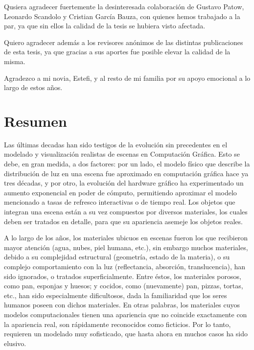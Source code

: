 \documentclass[spanish,a4paper,oneside,10pt,openright]{book}
\begin{document}
Qusiera agradecer fuertemente la desinteresada colaboración de Gustavo Patow, Leonardo Scandolo y Cristian García Bauza, con quienes hemos trabajado a la par, ya que sin ellos la calidad de la tesis se hubiera visto afectada.

Quiero agradecer además a los revisores anónimos de las distintas publicaciones de esta tesis, ya que gracias a sus aportes fue posible elevar la calidad de la misma.

Agradezco a mi novia, Estefi, y al resto de mi familia por su apoyo emocional a lo largo de estos años.

\phantom{p. 1}
\clearpage
\thispagestyle{empty}
\phantom{p. 2}
\clearpage

\chapter*{Resumen} %

Las últimas decadas han sido testigos de la evolución sin precedentes en el modelado y visualización realistas de escenas en Computación Gráfica.
Esto se debe, en gran medida, a dos factores: por un lado, el modelo físico que describe la distribución de luz en una escena fue aproximado en computación gráfica hace ya tres décadas, y por otro, la evolución del hardware gráfico ha experimentado un aumento exponencial en poder de cómputo, permitiendo aproximar el modelo mencionado a tasas de refresco interactivas o de tiempo real.
Los objetos que integran una escena están a su vez compuestos por diversos materiales, los cuales deben ser tratados en detalle, para que su apariencia asemeje los objetos reales.

A lo largo de los años, los materiales ubicuos en escenas fueron los que recibieron mayor atención (agua, nubes, piel humana, etc.), sin embargo muchos materiales, debido a su complejidad estructural (geometría, estado de la materia), o su complejo comportamiento con la luz (reflectancia, absorción, translucencia), han sido ignorados, o tratados superficialmente.
Entre éstos, los materiales porosos, como pan, esponjas y huesos; y cocidos, como (nuevamente) pan, pizzas, tortas, etc., han sido especialmente dificultosos, dada la familiaridad que los seres humanos poseen con dichos materiales.
En otras palabras, los materiales cuyos modelos computacionales tienen una apariencia que no coincide exactamente con la apariencia real, son rápidamente reconocidos como ficticios. Por lo tanto, requieren un modelado muy sofisticado, que hasta ahora en muchos casos ha sido elusivo.
\end{document}

